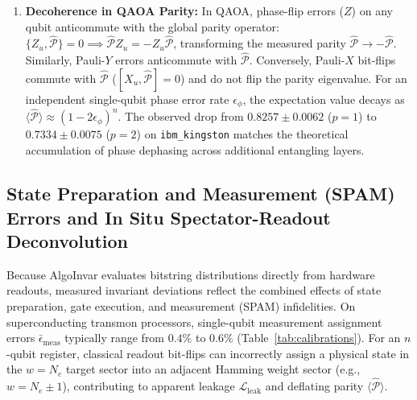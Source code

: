 \documentclass[aps,pra,reprint,superscriptaddress,floatfix,nofootinbib]{revtex4-2}
\begin{document}
\begin{enumerate}
    \item \textbf{Decoherence in QAOA Parity:} In QAOA, phase-flip errors ($Z$) on any qubit anticommute with the global parity operator: $\{Z_u, \hat{\mathcal{P}}\} = 0 \implies \hat{\mathcal{P}} Z_u = -Z_u \hat{\mathcal{P}}$, transforming the measured parity $\hat{\mathcal{P}} \to -\hat{\mathcal{P}}$. Similarly, Pauli-$Y$ errors anticommute with $\hat{\mathcal{P}}$. Conversely, Pauli-$X$ bit-flips commute with $\hat{\mathcal{P}}$ ($[X_u, \hat{\mathcal{P}}] = 0$) and do not flip the parity eigenvalue. For an independent single-qubit phase error rate $\epsilon_\phi$, the expectation value decays as $\langle \hat{\mathcal{P}} \rangle \approx (1 - 2\epsilon_\phi)^n$. The observed drop from $0.8257 \pm 0.0062$ ($p=1$) to $0.7334 \pm 0.0075$ ($p=2$) on \texttt{ibm\_kingston} matches the theoretical accumulation of phase dephasing across additional entangling layers.
\end{enumerate}

\subsection{State Preparation and Measurement (SPAM) Errors and In Situ Spectator-Readout Deconvolution}
\label{sec:spam_deconvolution}
Because AlgoInvar evaluates bitstring distributions directly from hardware readouts, measured invariant deviations reflect the combined effects of state preparation, gate execution, and measurement (SPAM) infidelities. On superconducting transmon processors, single-qubit measurement assignment errors $\bar{\epsilon}_{\text{meas}}$ typically range from $0.4\%$ to $0.6\%$ (Table~\ref{tab:calibrations}). For an $n$-qubit register, classical readout bit-flips can incorrectly assign a physical state in the $w = N_e$ target sector into an adjacent Hamming weight sector (e.g., $w = N_e \pm 1$), contributing to apparent leakage $\mathcal{L}_{\text{leak}}$ and deflating parity $\langle \hat{\mathcal{P}} \rangle$. 
\end{document}
